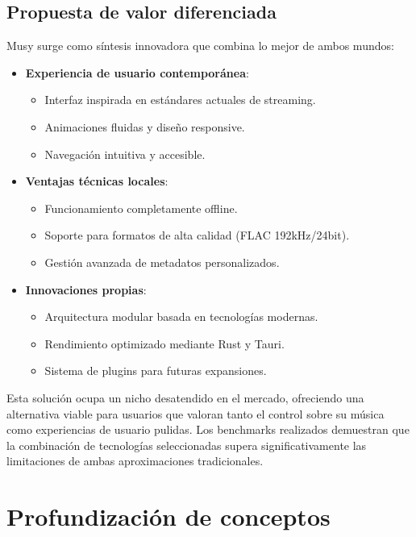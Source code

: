\documentclass[11pt, a4paper]{article}
\begin{document}
  \subsection{Propuesta de valor diferenciada}

  Musy surge como síntesis innovadora que combina lo mejor de ambos mundos:

  \begin{itemize}
      \item \textbf{Experiencia de usuario contemporánea}:
      \begin{itemize}
          \item Interfaz inspirada en estándares actuales de streaming.
          \item Animaciones fluidas y diseño responsive.
          \item Navegación intuitiva y accesible.
      \end{itemize}
      
      \item \textbf{Ventajas técnicas locales}:
      \begin{itemize}
          \item Funcionamiento completamente offline.
          \item Soporte para formatos de alta calidad (FLAC 192kHz/24bit).
          \item Gestión avanzada de metadatos personalizados.
      \end{itemize}
      
      \item \textbf{Innovaciones propias}:
      \begin{itemize}
          \item Arquitectura modular basada en tecnologías modernas.
          \item Rendimiento optimizado mediante Rust y Tauri.
          \item Sistema de plugins para futuras expansiones.
      \end{itemize}
  \end{itemize}

  Esta solución ocupa un nicho desatendido en el mercado, ofreciendo una alternativa viable para usuarios que valoran tanto el control sobre su música como experiencias de usuario pulidas. Los benchmarks realizados demuestran que la combinación de tecnologías seleccionadas supera significativamente las limitaciones de ambas aproximaciones tradicionales.

\section{Profundización de conceptos}
\end{document}
